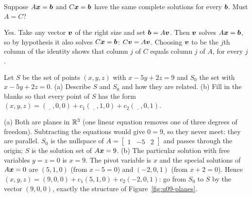 \begin{exercise}\label{exr:u09-sameC}
Suppose $A\boldsymbol{x}=\boldsymbol{b}$ and $C\boldsymbol{x}=\boldsymbol{b}$ have the same complete solutions for every
$\boldsymbol{b}$. Must $A=C$?
\end{exercise}
\begin{solution}
Yes. Take any vector $\boldsymbol{v}$ of the right size and set $\boldsymbol{b}=A\boldsymbol{v}$. Then $\boldsymbol{v}$ solves
$A\boldsymbol{x}=\boldsymbol{b}$, so by hypothesis it also solves $C\boldsymbol{x}=\boldsymbol{b}$: $C\boldsymbol{v}=A\boldsymbol{v}$. Choosing
$\boldsymbol{v}$ to be the $j$th column of the identity shows that column $j$ of $C$ equals column $j$ of
$A$, for every $j$.
\end{solution}

\begin{exercise}\label{exr:u09-planes}
Let $S$ be the set of points $(x,y,z)$ with $x-5y+2z=9$ and $S_0$ the set with
$x-5y+2z=0$. (a) Describe $S$ and $S_0$ and how they are related. (b) Fill in the blanks so that
every point of $S$ has the form
$(x,y,z)=(\,\underline{\ \ }\,,0,0)+c_1(\,\underline{\ \ }\,,1,0)+c_2(\,\underline{\ \ }\,,0,1)$.
\end{exercise}
\begin{solution}
(a) Both are planes in $\mathbb{R}^3$ (one linear equation removes one of three degrees of freedom).
Subtracting the equations would give $0=9$, so they never meet: they are parallel. $S_0$ is the
nullspace of $A=\begin{bmatrix}1&-5&2\end{bmatrix}$ and passes through the origin; $S$ is the
solution set of $A\boldsymbol{x}=9$. (b) The particular solution with free variables $y=z=0$ is
$x=9$. The pivot variable is $x$ and the special solutions of $A\boldsymbol{x}=0$ are $(5,1,0)$ (from
$x-5=0$) and $(-2,0,1)$ (from $x+2=0$). Hence
$(x,y,z)=(9,0,0)+c_1(5,1,0)+c_2(-2,0,1)$: go from $S_0$ to $S$ by the vector $(9,0,0)$, exactly
the structure of Figure~\ref{fig:u09-planes}.
\end{solution}
